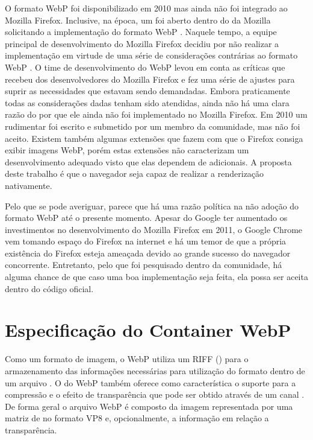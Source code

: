\documentclass[espaco=simples,appendix=Name]{abnt}
\begin{document}
O formato WebP foi disponibilizado em 2010 mas ainda não foi integrado ao Mozilla Firefox. Inclusive, na época, um  foi aberto dentro do  da Mozilla solicitando a implementação do formato WebP \cite{FirefoxBug}. Naquele tempo, a equipe principal de desenvolvimento do Mozilla Firefox decidiu por não realizar a implementação em virtude de uma série de considerações contrárias ao formato WebP \cite{WebPCritica}. O time de desenvolvimento do WebP levou em conta as críticas que recebeu dos desenvolvedores do Mozilla Firefox e fez uma série de ajustes para suprir as necessidades que estavam sendo demandadas. Embora praticamente todas as considerações dadas tenham sido atendidas, ainda não há uma clara razão do por que ele ainda não foi implementado no Mozilla Firefox. Em 2010 um  rudimentar foi escrito e submetido por um membro da comunidade, mas não foi aceito. Existem também algumas extensões que fazem com que o Firefox consiga exibir imagens WebP, porém estas extensões não caracterizam um desenvolvimento adequado visto que elas dependem de  adicionais. A proposta deste trabalho é que o navegador seja capaz de realizar a renderização nativamente.

Pelo que se pode averiguar, parece que há uma razão política na não adoção do formato WebP até o presente momento. Apesar do Google ter aumentado os investimentos no desenvolvimento do Mozilla Firefox em 2011, o Google Chrome vem tomando espaço do Firefox na internet e há um temor de que a própria existência do Firefox esteja ameaçada devido ao grande sucesso do navegador concorrente. Entretanto, pelo que foi pesquisado dentro da comunidade, há alguma chance de que caso uma boa implementação seja feita, ela possa ser aceita dentro do código oficial.

\section{Especificação do Container WebP}

Como um formato de imagem, o WebP utiliza um  RIFF () para o armazenamento das informações necessárias para utilização do formato dentro de um arquivo \cite{RIFFContainer}. O  do WebP também oferece como característica o suporte para a compressão  e o efeito de transparência que pode ser obtido através de um canal . De forma geral o arquivo WebP é composto da imagem representada por uma matriz de  no formato VP8 e, opcionalmente, a informação em relação a transparência.
\end{document}
